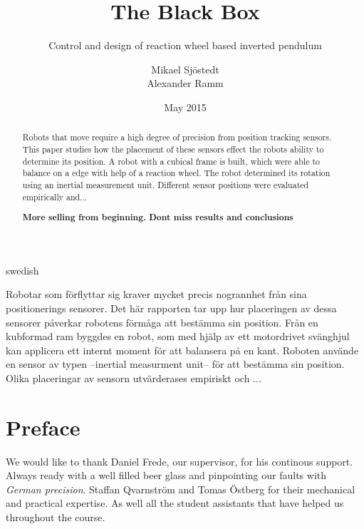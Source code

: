 \documentclass[a4paper,11pt]{kth-mag}
\title{The Black Box}
\subtitle{Control and design of reaction wheel based inverted pendulum}
\author{Mikael Sjöstedt \\ Alexander Ramm}
\date{May 2015}
\begin{document}

\clearpage

\frontmatter
\pagestyle{plain}
{}
\maketitle
{}
\begin{abstract}
Robots that move require a high degree of precision from position tracking sensors. This paper studies how the 
placement of these sensors effect the robots ability to determine its position. A robot with a cubical frame is
built, which were able to balance on a edge with help of a reaction wheel. The robot determined its rotation using an inertial measurement unit. Different sensor positions were evaluated empirically and...

\textbf{More selling from beginning. Dont miss results and conclusions}
 
\end{abstract}
\cleardoublepage
\begin{foreignabstract}{swedish}
Robotar som förflyttar sig kraver mycket precis nogrannhet från sina positionerings sensorer. Det här rapporten tar
upp hur placeringen av dessa sensorer påverkar robotens förmåga att bestämma sin position. Från en kubformad ram 
byggdes en robot, som med hjälp av ett motordrivet svänghjul kan applicera ett internt moment för att balansera på en kant. Roboten använde en sensor av typen --inertial measurment unit-- för att bestämma sin position. Olika placeringar av sensorn utvärderases empiriskt och ...
\\


\end{foreignabstract}
\clearpage
\chapter*{Preface}
We would like to thank Daniel Frede, our supervisor, for his continous support. Always ready with a well filled beer glass and pinpointing our faults with \textit{German precision}. Staffan Qvarnström and Tomas Östberg for their mechanical and practical expertise. As well all the student assistants that have helped us throughout the course.
\end{document}
